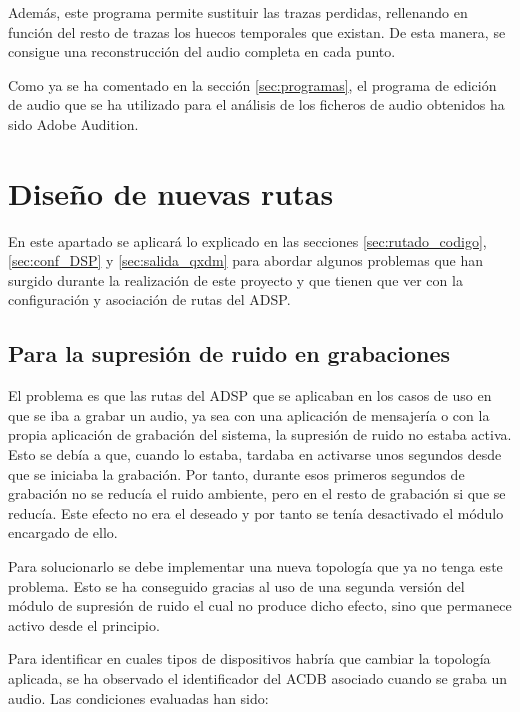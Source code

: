 Además, este programa permite sustituir las trazas perdidas, rellenando en función del resto de trazas los huecos temporales que existan. De esta manera, se consigue una reconstrucción del audio completa en cada punto. 

Como ya se ha comentado en la sección \ref{sec:programas}, el programa de edición de audio que se ha utilizado para el análisis de los ficheros de audio obtenidos ha sido Adobe Audition.

\section{Diseño de nuevas rutas}
En este apartado se aplicará lo explicado en las secciones \ref{sec:rutado_codigo}, \ref{sec:conf_DSP} y \ref{sec:salida_qxdm} para abordar algunos problemas que han surgido durante la realización de este proyecto y que tienen que ver con la configuración y asociación de rutas del \gls{ADSP}. 

\subsection{Para la supresión de ruido en grabaciones}
El problema es que las rutas del \gls{ADSP} que se aplicaban en los casos de uso en que se iba a grabar un audio, ya sea con una aplicación de mensajería o con la propia aplicación de grabación del sistema, la supresión de ruido no estaba activa. Esto se debía a que, cuando lo estaba, tardaba en activarse unos segundos desde que se iniciaba la grabación. Por tanto, durante esos primeros segundos de grabación no se reducía el ruido ambiente, pero en el resto de grabación si que se reducía. Este efecto no era el deseado y por tanto se tenía desactivado el módulo encargado de ello.

Para solucionarlo se debe implementar una nueva topología que ya no tenga este problema. Esto se ha conseguido gracias al uso de una segunda versión del módulo de supresión de ruido el cual no produce dicho efecto, sino que permanece activo desde el principio.

Para identificar en cuales tipos de dispositivos habría que cambiar la topología aplicada, se ha observado el identificador del \gls{ACDB} asociado cuando se graba un audio. Las condiciones evaluadas han sido:

